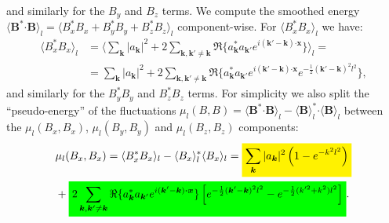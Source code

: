 \documentclass[]{article}
\newcommand{\mathcolorbox}[2]{\colorbox{#1}{$\displaystyle #2$}}
\newcommand{\bcdot}{\bm{\cdot}}
\begin{document}
%
and similarly for the $B_y$ and $B_z$ terms.
We compute the smoothed energy $\langle \bm B^* \bcdot\bm B \rangle_l = \langle B_x^* B_x + B_y^* B_y + B_z^* B_z \rangle_l$ component-wise. For $\langle B_x^* B_x \rangle_l$ we have:
%
\begin{align}
	\langle B_x^* B_x \rangle_l &= \langle \sum_{\bm k} |a_{\bm k}|^2  + 2 \sum_{\bm k, \bm k' \neq \bm k} \Re \lbrace a_{\bm k}^* a_{\bm k'} e^{i (\bm k' - \bm k) \bcdot\bm x } \rbrace  \rangle_l = \nonumber \\
	&= \sum_{\bm k} |a_{\bm k}|^2 + 2 \sum_{\bm k, \bm k' \neq \bm k} \Re \lbrace a_{\bm k}^* a_{\bm k'} e^{i (\bm k' - \bm k) \bcdot\bm x } e^{-\frac{1}{2} (\bm k' - \bm k)^2 l^2} \rbrace,
\end{align}
%
and similarly for the $B_y^* B_y$ and $B_z^* B_z$ terms.
%
For simplicity we also split the ``pseudo-energy'' of the fluctuations $\mu_l(B,B) = \langle \bm B^* \bcdot\bm B \rangle_l - \langle \bm B \rangle_l^* \bcdot\langle \bm B \rangle_l$ between the $\mu_l(B_x,B_x)$, $\mu_l(B_y,B_y)$ and $\mu_l(B_z,B_z)$ components:
%
\begin{align}\label{eq:pseudo-energy-Bx}
	&\mu_l(B_x,B_x) = \langle B_x^* B_x \rangle_l - \langle B_x \rangle_l^* \langle B_x \rangle_l = \mathcolorbox{yellow}{\sum_{\bm k} |a_{\bm k}|^2 \left( 1 -  e^{- k^2 l^2} \right)} \nonumber \\
	& + \mathcolorbox{green}{2 \sum_{\bm k, \bm k' \neq \bm k} \Re \lbrace a_{\bm k}^* a_{\bm k'} e^{i (\bm k' - \bm k) \bcdot\bm x } \rbrace \left[ e^{-\frac{1}{2} (\bm k' - \bm k)^2 l^2} - e^{-\frac{1}{2} (k'^2 + k^2) l^2}\right]} .
\end{align}
\end{document}
